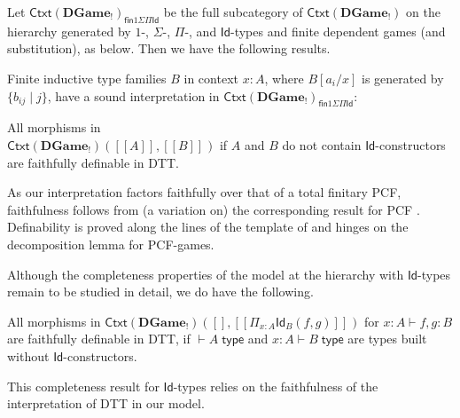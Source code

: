 \documentclass[runningheads,a4paper]{llncs}
\newcommand{\sem}[2][M\!,g]{ [\![ #2 ]\!]^{}}
\newcommand{\DGame}{\mathbf{DGame}}
\begin{document}
Let $\mathsf{Ctxt}(\DGame_!)_{\mathsf{fin}1\Sigma\Pi\mathsf{Id}}$ be the full subcategory of  $\mathsf{Ctxt}(\DGame_!)$ on the hierarchy generated by $1$-, $\Sigma$-, $\Pi$-, and $\mathsf{Id}$-types and finite dependent games (and substitution), as below. Then we have the following results.
\begin{theorem} Finite inductive type families $B$ in context $x:A$, where $B[a_i/x]$ is generated by $\{b_{ij}\;|\;  j\}$, have a sound interpretation in $\mathsf{Ctxt}(\DGame_!)_{\mathsf{fin}1\Sigma\Pi\mathsf{Id}}$: \;\resizebox{0.50\linewidth}{!}{\small
\begin{diagram}
\sem{B}:
\sem{a_i}& \rMapsto & [\widetilde{\{b_{ij}\;|\; j\}_*}], \quad& 
\mathsf{else} & \rMapsto & [\widetilde{\emptyset}_*].
\end{diagram}}
\end{theorem}


\begin{theorem}\label{thm:fdef} All morphisms in \\ $\mathsf{Ctxt}(\DGame_!)(\sem{A},\sem{B})$ if $A$ and $B$ do not contain $\mathsf{Id}$-constructors are faithfully definable in \textsf{DTT}.
\end{theorem}
As our interpretation factors faithfully over that of a total finitary PCF, faithfulness follows from (a variation on) the corresponding result for PCF \cite{abramsky2000full}. Definability is proved along the lines of the template of \cite{Abramsky00axiomsfor} and hinges on the decomposition lemma for PCF-games.

Although the completeness properties of the model at the hierarchy with $\mathsf{Id}$-types remain to be studied in detail, we do have the following.

\begin{theorem}\label{thm:complid} All morphisms in $\mathsf{Ctxt}(\DGame_!)([],\sem{\Pi_{x:A}\mathsf{Id}_B(f,g)})$ for $x:A\vdash f,g:B$ are faithfully definable in \textsf{DTT}, if $\vdash A\;\mathsf{type}$ and $x:A\vdash B\;\mathsf{type}$ are types built without $\mathsf{Id}$-constructors.
\end{theorem}
This completeness result for $\mathsf{Id}$-types relies on the faithfulness of the interpretation of \textsf{DTT} in our model.
\vspace{-5pt}
\end{document}
